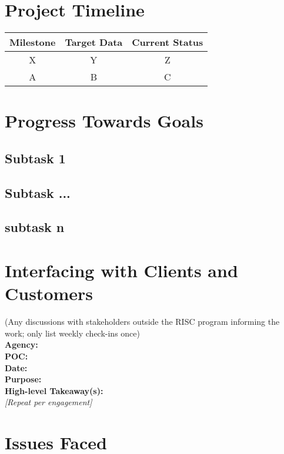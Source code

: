 \documentclass[letterpaper, 10pt]{article}
\begin{document}
\begin{multicols}{2}
    \section{Project Timeline}
        \begin{center}
            \begin{tabular}{c|c|c}
                 Milestone  & Target Data   & Current Status  \\
                 \hline
                 X          & Y             & Z \\
                 A          & B             & C
            \end{tabular}
            \label{tab:my_label}
        \end{center}
    \section{Progress Towards Goals}
        \subsection{Subtask 1}
            \lipsum[5]
        \subsection{Subtask ...}
            \lipsum[6]
        \subsection{subtask n}
            \lipsum[7]
    \section{Interfacing with Clients and Customers}
        (Any discussions with stakeholders outside the RISC  program informing the work; only list weekly check-ins  once) \\
        \textbf{Agency:} \\  
        \textbf{POC:}  \\
        \textbf{Date:} \\
        \textbf{Purpose:} \\
        \textbf{High-level Takeaway(s):} \\ 
        \textit{[Repeat per engagement]} 

    \section{Issues Faced}
        \lipsum[8]

\end{multicols}
\end{document}

